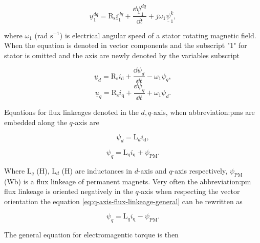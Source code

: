 \documentclass[a4paper, twoside, 11pt]{article}
\begin{document}
        \begin{equation}
            \underline{u}^{dq}_1 = \text{R}_\text{s} \underline{i}^{dq}_1 + \frac{\dd \underline{\psi}^{dq}_1 }{\dd t} + j \omega_1 \underline{\psi}^k_1,
        \end{equation}
        
        where $\omega_1$ (rad $\text{s}^{-1}$) is electrical angular speed of a stator rotating magnetic field. When the equation is denoted in vector components and the subscript "1" for stator is omitted and the axis are newly denoted by the variables subscript

        \begin{equation}
            \underline{u}_d = \text{R}_\text{s} i_\text{d} + \frac{\dd \psi_d}{\dd t} - \omega_1\psi_q,
        \end{equation}
        \begin{equation}
            \underline{u}_q = \text{R}_\text{s} i_\text{q} + \frac{\dd \psi_q}{\dd t} + \omega_1\psi_d.
        \end{equation}

        Equations for flux linkeages denoted in the $d,q$-axis, when \gls{abbreviation:pm}s are embedded along the $q$-axis are

        \begin{equation}\label{eq:d-axis-flux-linkeage}
            \psi_d = \text{L}_d i_\text{d},
        \end{equation}

        \begin{equation}\label{eq:q-axis-flux-linkeage-general}
            \psi_q = \text{L}_q i_\text{q} + \psi_\text{PM}.
        \end{equation}

        Where $\text{L}_q$ (H), $\text{L}_d$ (H) are inductances in $d$-axis and $q$-axis respectively, $\psi_\text{PM}$ (Wb) is a flux linkeage of permanent magnets. Very often the \gls{abbreviation:pm} flux linkeage is oriented negatively in the $q$-axis when respecting the vector orientation the equation \ref{eq:q-axis-flux-linkeage-general} can be rewritten as

        \begin{equation}\label{eq:q-axis-flux-linkeage-rewritten}
            \psi_q = \text{L}_q i_\text{q} - \psi_\text{PM}.
        \end{equation}
        
        The general equation for electromagentic torque is then
\end{document}
